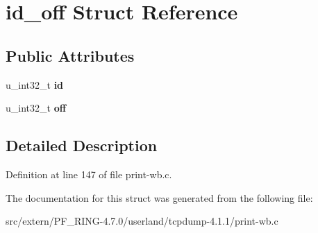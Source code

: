 \hypertarget{structid__off}{
\section{id\_\-off Struct Reference}
\label{structid__off}
}
\subsection*{Public Attributes}
\begin{DoxyCompactItemize}
\item 
\hypertarget{structid__off_aac16080260394dca218122d12c0c2a48}{
u\_\-int32\_\-t {\bfseries id}}
\label{structid__off_aac16080260394dca218122d12c0c2a48}

\item 
\hypertarget{structid__off_a40768f03f2a232d0b6e339bbf0dd5e33}{
u\_\-int32\_\-t {\bfseries off}}
\label{structid__off_a40768f03f2a232d0b6e339bbf0dd5e33}

\end{DoxyCompactItemize}


\subsection{Detailed Description}


Definition at line 147 of file print-\/wb.c.



The documentation for this struct was generated from the following file:\begin{DoxyCompactItemize}
\item 
src/extern/PF\_\-RING-\/4.7.0/userland/tcpdump-\/4.1.1/print-\/wb.c\end{DoxyCompactItemize}
